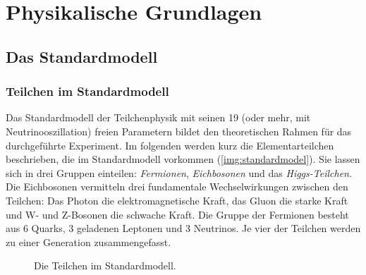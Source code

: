 \section{Physikalische Grundlagen}
\subsection{Das Standardmodell}
\subsubsection*{Teilchen im Standardmodell}
Das Standardmodell der Teilchenphysik mit seinen 19 (oder mehr, mit Neutrinooszillation) freien Parametern
bildet den theoretischen Rahmen für das durchgeführte Experiment.
Im folgenden werden kurz die Elementarteilchen beschrieben, die im Standardmodell vorkommen (\autoref{img:standardmodel}).
Sie lassen sich in drei Gruppen einteilen:
\emph{Fermionen}, \emph{Eichbosonen} und das \emph{Higgs-Teilchen}.
Die Eichbosonen vermitteln drei fundamentale Wechselwirkungen zwischen den Teilchen:
Das Photon die elektromagnetische Kraft, das Gluon die starke Kraft und W- und Z-Bosonen die schwache Kraft.
Die Gruppe der Fermionen besteht aus 6 Quarks, 3 geladenen Leptonen und 3 Neutrinos.
Je vier der Teilchen werden zu einer Generation zusammengefasst.

\begin{figure}[H]
    \centering
    \def\svgwidth{0.55\textwidth}
    
    \caption{Die Teilchen im Standardmodell.}
    \label{img:standardmodel}
\end{figure}

